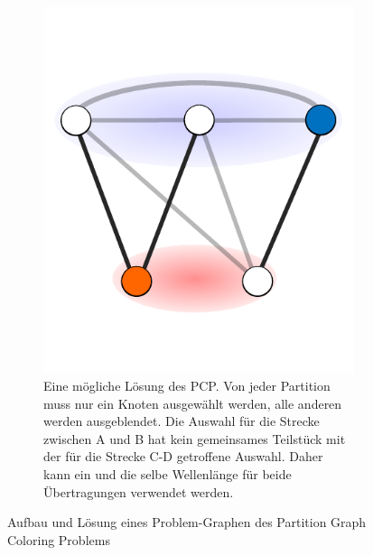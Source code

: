 \begin{figure}
\begin{subfigure}[t]{0.3\textwidth}
		\includegraphics[width=\textwidth]{img/bsp5}
		\caption{Eine mögliche Lösung des PCP\@. Von jeder Partition muss nur ein Knoten ausgewählt werden, alle anderen werden ausgeblendet. Die Auswahl für die Strecke zwischen A und B hat kein gemeinsames Teilstück mit der für die Strecke C-D getroffene Auswahl. Daher kann ein und die selbe Wellenlänge für beide Übertragungen verwendet werden.}
		\label{fig:example:e}
	\end{subfigure}
	
	\caption{Aufbau und Lösung eines Problem-Graphen des Partition Graph Coloring Problems}
\end{figure}


